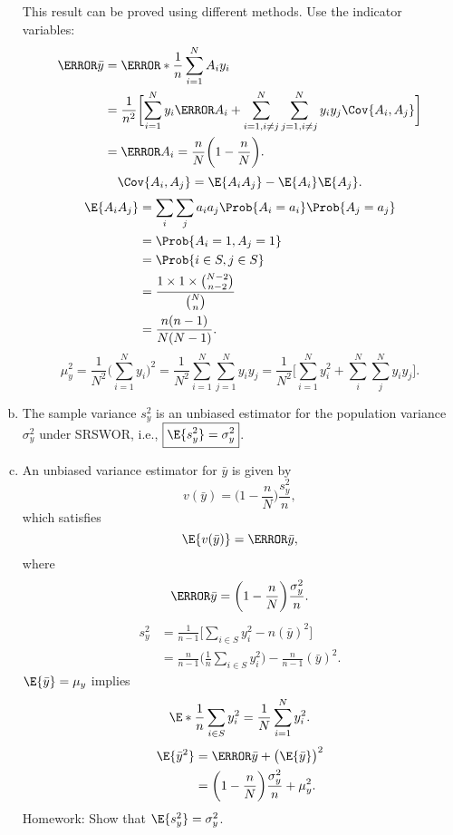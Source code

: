 \documentclass[oneside]{book}\usepackage[]{graphicx}\usepackage[svgnames]{xcolor}
\begin{document}
\begin{enumerate}[(a)]
            This result can be proved using different methods. Use the indicator variables:
            \begin{align}
                  \V{\bar{y}}
                   & =\V*{\frac{1}{n}\sum_{i=1}^{N}A_i y_i}                            \\
                   & =\frac{1}{n^2}\biggl[\sum_{i=1}^{N}y_i\V{A_i}+
                  \sum_{i=1,i\ne j}^{N}\sum_{j=1,i\ne j}^{N}y_iy_j\Cov{A_i,A_j}\biggr] \\
                   & =\V{A_i}=\frac{n}{N}\biggl(1-\frac{n}{N}\biggr).
            \end{align}
            \[ \Cov{A_i,A_j}=\E{A_iA_j}-\E{A_i}\E{A_j}. \]
            \begin{align*}
                  \E{A_iA_j}
                   & =\sum_i\sum_j a_ia_j \Prob{A_i=a_i}\Prob{A_j=a_j}      \\
                   & =\Prob{A_i=1,A_j=1}                                    \\
                   & =\Prob{i\in S,j\in S}                                  \\
                   & =\frac{1\times 1\times \binom{N-2}{n-2}}{\binom{N}{n}} \\
                   & =\frac{n(n-1)}{N(N-1)}.
            \end{align*}
            \[ \mu_y^2=\frac{1}{N^2}\biggl(\sum_{i=1}^{N}y_i\biggr)^2=\frac{1}{N^2}\sum_{i=1}^{N}\sum_{j=1}^{N}y_iy_j
                  =\frac{1}{N^2}\biggl[\sum_{i=1}^{N}y_i^2+\sum_{i}^{N}\sum_{j}^{N}y_iy_j\biggr]. \]
      \item The sample variance $ s_y^2 $ is an unbiased estimator for the
            population variance $ \sigma_y^2 $ under SRSWOR, i.e.,
            $ \boxed{\E{s_y^2}=\sigma_y^2} $.
      \item An unbiased variance estimator for $ \bar{y} $ is given by
            \[ v(\bar{y})=\biggl(1-\frac{n}{N}\biggr)\frac{s_y^2}{n}, \]
            which satisfies
            \[ \E{v(\bar{y})}=\V{\bar{y}}, \]
            where
            \[ \V{\bar{y}}=\biggl(1-\frac{n}{N}\biggr)\frac{\sigma_y^2}{n}. \]
            \begin{align*}
                  s_y^2
                   & =\frac{1}{n-1}\biggl[\sum_{i\in S}y_i^2-n(\bar{y})^2\biggr]                         \\
                   & =\frac{n}{n-1}\biggl(\frac{1}{n}\sum_{i\in S}y_i^2\biggr)-\frac{n}{n-1}(\bar{y})^2.
            \end{align*}
            $ \E{\bar{y}}=\mu_y $ implies
            \begin{align*}
                  \E*{\frac{1}{n}\sum_{i\in S}y_i^2}=\frac{1}{N}\sum_{i=1}^{N}y_i^2.
            \end{align*}
            \begin{align*}
                  \E{\bar{y}^2}
                   & =\V{\bar{y}}+\bigl(\E{\bar{y}}\bigr)^2                    \\
                   & =\biggl(1-\frac{n}{N}\biggr)\frac{\sigma_y^2}{n}+\mu_y^2.
            \end{align*}
            Homework: Show that $ \E{s_y^2}=\sigma_y^2 $.
\end{enumerate}
\end{document}
